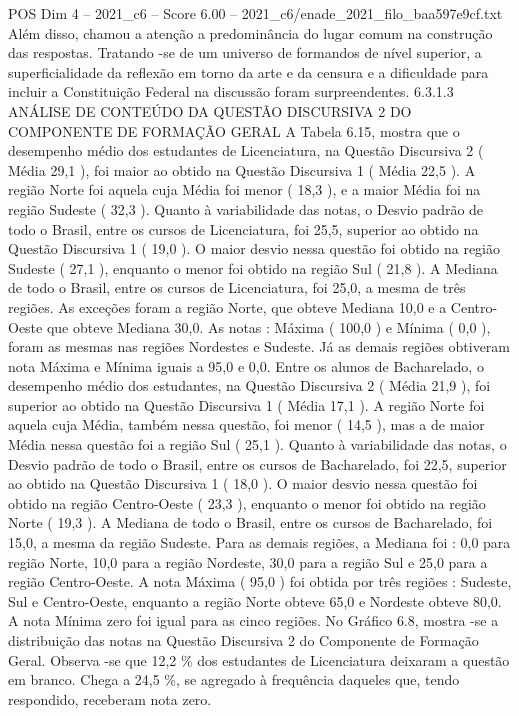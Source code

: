 \begin{textsample}{POS Dim 4 – 2021\_c6 – Score 6.00 – 2021\_c6/enade\_2021\_filo\_baa597e9cf.txt}
Além disso, chamou a atenção a predominância do lugar comum na construção das respostas.
Tratando -se de um universo de formandos de nível superior, a superficialidade da reflexão em torno da arte e da censura e a dificuldade para incluir a Constituição Federal na discussão foram surpreendentes. 6.3.1.3 ANÁLISE DE CONTEÚDO DA QUESTÃO DISCURSIVA 2 DO COMPONENTE DE FORMAÇÃO GERAL A Tabela 6.15, mostra que o desempenho médio dos estudantes de Licenciatura, na Questão Discursiva 2 ( Média 29,1 ), foi maior ao obtido na Questão Discursiva 1 ( Média 22,5 ).
A região Norte foi aquela cuja Média foi menor ( 18,3 ), e a maior Média foi na região Sudeste ( 32,3 ).
Quanto à variabilidade das notas, o Desvio padrão de todo o Brasil, entre os cursos de Licenciatura, foi 25,5, superior ao obtido na Questão Discursiva 1 ( 19,0 ).
O maior desvio nessa questão foi obtido na região Sudeste ( 27,1 ), enquanto o menor foi obtido na região Sul ( 21,8 ).
A Mediana de todo o Brasil, entre os cursos de Licenciatura, foi 25,0, a mesma de três regiões.
As exceções foram a região Norte, que obteve Mediana 10,0 e a Centro-Oeste que obteve Mediana 30,0.
As notas : Máxima ( 100,0 ) e Mínima ( 0,0 ), foram as mesmas nas regiões Nordestes e Sudeste.
Já as demais regiões obtiveram nota Máxima e Mínima iguais a 95,0 e 0,0.
Entre os alunos de Bacharelado, o desempenho médio dos estudantes, na Questão Discursiva 2 ( Média 21,9 ), foi superior ao obtido na Questão Discursiva 1 ( Média 17,1 ).
A região Norte foi aquela cuja Média, também nessa questão, foi menor ( 14,5 ), mas a de maior Média nessa questão foi a região Sul ( 25,1 ).
Quanto à variabilidade das notas, o Desvio padrão de todo o Brasil, entre os cursos de Bacharelado, foi 22,5, superior ao obtido na Questão Discursiva 1 ( 18,0 ).
O maior desvio nessa questão foi obtido na região Centro-Oeste ( 23,3 ), enquanto o menor foi obtido na região Norte ( 19,3 ).
A Mediana de todo o Brasil, entre os cursos de Bacharelado, foi 15,0, a mesma da região Sudeste.
Para as demais regiões, a Mediana foi : 0,0 para região Norte, 10,0 para a região Nordeste, 30,0 para a região Sul e 25,0 para a região Centro-Oeste.
A nota Máxima ( 95,0 ) foi obtida por três regiões : Sudeste, Sul e Centro-Oeste, enquanto a região Norte obteve 65,0 e Nordeste obteve 80,0.
A nota Mínima zero foi igual para as cinco regiões.
No Gráfico 6.8, mostra -se a distribuição das notas na Questão Discursiva 2 do Componente de Formação Geral.
Observa -se que 12,2 \% dos estudantes de Licenciatura deixaram a questão em branco.
Chega a 24,5 \%, se agregado à frequência daqueles que, tendo respondido, receberam nota zero.

\end{textsample}
